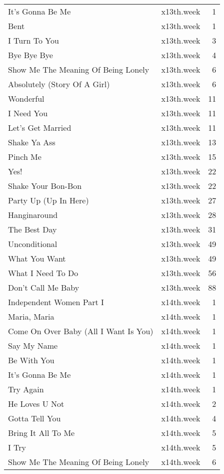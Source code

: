 \begin{table}[ht]
\begin{tabular}{llr}
  It's Gonna Be Me & x13th.week &   1 \\ 
  Bent & x13th.week &   1 \\ 
  I Turn To You & x13th.week &   3 \\ 
  Bye Bye Bye & x13th.week &   4 \\ 
  Show Me The Meaning Of Being Lonely & x13th.week &   6 \\ 
  Absolutely (Story Of A Girl) & x13th.week &   6 \\ 
  Wonderful & x13th.week &  11 \\ 
  I Need You & x13th.week &  11 \\ 
  Let's Get Married & x13th.week &  11 \\ 
  Shake Ya Ass & x13th.week &  13 \\ 
  Pinch Me & x13th.week &  15 \\ 
  Yes! & x13th.week &  22 \\ 
  Shake Your Bon-Bon & x13th.week &  22 \\ 
  Party Up (Up In Here) & x13th.week &  27 \\ 
  Hanginaround & x13th.week &  28 \\ 
  The Best Day & x13th.week &  31 \\ 
  Unconditional & x13th.week &  49 \\ 
  What You Want & x13th.week &  49 \\ 
  What I Need To Do & x13th.week &  56 \\ 
  Don't Call Me Baby & x13th.week &  88 \\ 
  Independent Women Part I & x14th.week &   1 \\ 
  Maria, Maria & x14th.week &   1 \\ 
  Come On Over Baby (All I Want Is You) & x14th.week &   1 \\ 
  Say My Name & x14th.week &   1 \\ 
  Be With You & x14th.week &   1 \\ 
  It's Gonna Be Me & x14th.week &   1 \\ 
  Try Again & x14th.week &   1 \\ 
  He Loves U Not & x14th.week &   2 \\ 
  Gotta Tell You & x14th.week &   4 \\ 
  Bring It All To Me & x14th.week &   5 \\ 
  I Try & x14th.week &   5 \\ 
  Show Me The Meaning Of Being Lonely & x14th.week &   6 \\ 

\end{tabular}
\end{table}
